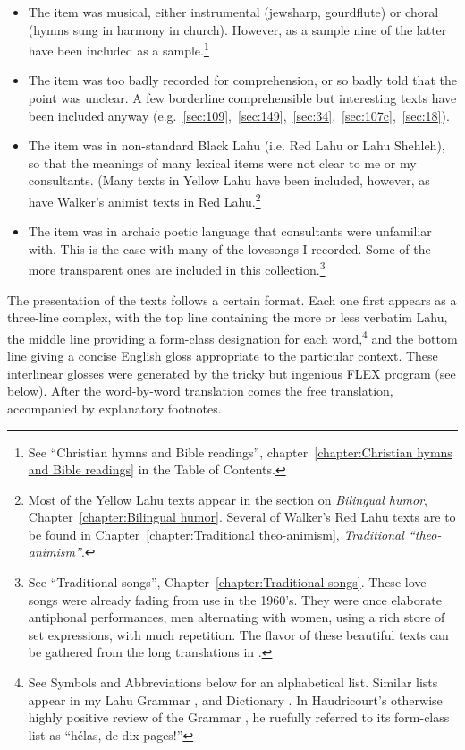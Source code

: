 \begin{itemize}
\item The item was musical, either instrumental (jewsharp, gourdflute)
  or choral (hymns sung in harmony in church). However, as a sample
  nine of the latter have been included as a sample.\footnote{See ``Christian
    hymns and Bible readings'', chapter~\ref{chapter:Christian hymns
      and Bible readings} in the Table of Contents.}

\item The item was too badly recorded for comprehension, or so badly
  told that the point was unclear. A few borderline comprehensible but
  interesting texts have been included anyway
  (e.g.~\ref{sec:109},~\ref{sec:149},~\ref{sec:34},~\ref{sec:107c},~\ref{sec:18}).
  
\item The item was in non-standard Black Lahu (i.e. Red Lahu or Lahu
  Shehleh), so that the meanings of many lexical items were not clear
  to me or my consultants. (Many texts in Yellow Lahu have been
  included, however, as have Walker's animist texts in Red
  Lahu.\footnote{Most of the Yellow Lahu texts appear in the section
    on \emph{Bilingual humor}, Chapter~\ref{chapter:Bilingual humor}. Several of Walker's Red Lahu texts
    are to be found in Chapter~\ref{chapter:Traditional theo-animism}, \emph{Traditional
      ``theo-animism''}.}
  
\item
  The item was in archaic poetic language that consultants were
  unfamiliar with. This is the case with many of the lovesongs I recorded.
  Some of the more transparent ones are included in this collection.\footnote{See
    ``Traditional songs'', Chapter~\ref{chapter:Traditional songs}. These love-songs were already
    fading from use in the 1960's. They were once elaborate antiphonal
    performances, men alternating with women, using a rich store of set
    expressions, with much repetition. The flavor of these beautiful texts
    can be gathered from the long translations in \citet[][pp. 151-174]{y13}.}
\end{itemize}

The presentation of the texts follows a certain format. Each one first
appears as a three-line complex, with the top line containing the more
or less verbatim Lahu, the middle line providing a form-class
designation for each word,\footnote{See Symbols and Abbreviations
  below for an alphabetical list. Similar lists appear in my Lahu
  Grammar \citep[pp. xxviii- xxxvii]{matisoff1973grammar}, and
  Dictionary \citep[pp. xxi-xxiv]{88}. In Haudricourt's otherwise
  highly positive review of the Grammar \citep{h74}, he ruefully
  referred to its form-class list as ``hélas, de dix pages!''}  and
the bottom line giving a concise English gloss appropriate to the
particular context. These interlinear glosses were generated by the
tricky but ingenious FLEX program (see below). After the word-by-word
translation comes the free translation, accompanied by explanatory
footnotes.

